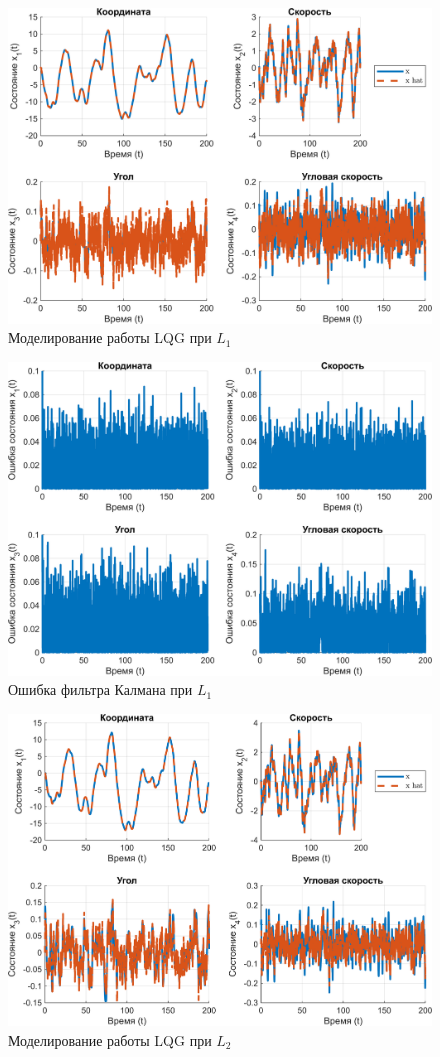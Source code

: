 \begin{figure}[H]
    \centering
    \includegraphics[width=0.9\linewidth]{figs/6.4.sim.1.png}
    \caption{Моделирование работы LQG при $L_1$}
    \label{fig:6.4.sim.1}
\end{figure}
\begin{figure}[H]
    \centering
    \includegraphics[width=0.9\linewidth]{figs/6.4.sim.1.err.png}
    \caption{Ошибка фильтра Калмана при $L_1$}
    \label{fig:6.4.sim.1.err}
\end{figure}
\begin{figure}[H]
    \centering
    \includegraphics[width=0.9\linewidth]{figs/6.4.sim.2.png}
    \caption{Моделирование работы LQG при $L_2$}
    \label{fig:6.4.sim.2}
\end{figure}
